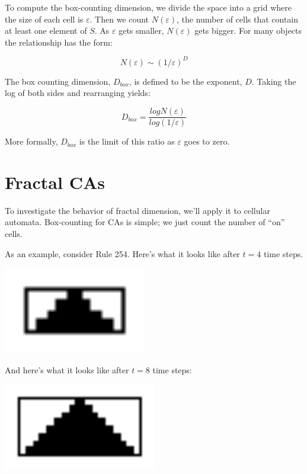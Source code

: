 \documentclass[10pt]{book}
\begin{document}
\newcommand{\veps}{\varepsilon}

To compute the box-counting dimension, we divide the space into a grid
where the size of each cell is $\veps$.  Then we count $N(\veps)$,
the number of cells that contain at least one element of $S$.  As
$\veps$ gets smaller, $N(\veps)$ gets bigger.  For many objects
the relationship has the form:

\[ N(\veps) \sim \left( 1 / \veps \right)^D \]

The box counting dimension, $D_{box}$, is defined to be the exponent, $D$.
Taking the log of both sides and rearranging yields:

\[ D_{box} = \frac{log N(\veps)}{log \left( 1 / \veps \right)} \]

More formally, $D_{box}$ is the limit of this ratio as $\veps$ goes
to zero.


\section{Fractal CAs}

To investigate the behavior of fractal dimension, we'll apply it
to cellular automata.  Box-counting for CAs is simple; we
just count the number of ``on'' cells.

As an example, consider Rule 254.  Here's what it looks like after
$t=4$ time steps.

\beforefig
\centerline{\includegraphics[height=1.5in]{figs/fractal254.4.eps}}
\afterfig

And here's what it looks like after $t=8$ time steps:

\beforefig
\centerline{\includegraphics[height=1.5in]{figs/fractal254.8.eps}}
\afterfig
\end{document}
